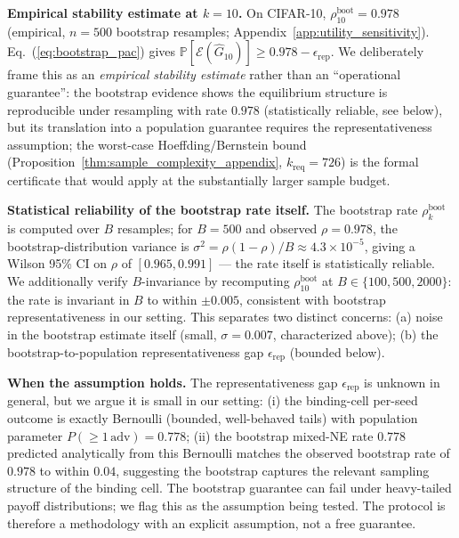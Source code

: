 \documentclass{article}
\begin{document}
\textbf{Empirical stability estimate at $k=10$.} On CIFAR-10, $\rho_{10}^{\mathrm{boot}} = 0.978$ (empirical, $n=500$ bootstrap resamples; Appendix~\ref{app:utility_sensitivity}). Eq.~(\ref{eq:bootstrap_pac}) gives $\mathbb{P}[\mathcal{E}(\hat G_{10})] \geq 0.978 - \epsilon_{\mathrm{rep}}$. We deliberately frame this as an \emph{empirical stability estimate} rather than an ``operational guarantee'': the bootstrap evidence shows the equilibrium structure is reproducible under resampling with rate $0.978$ (statistically reliable, see below), but its translation into a population guarantee requires the representativeness assumption; the worst-case Hoeffding/Bernstein bound (Proposition~\ref{thm:sample_complexity_appendix}, $k_{\mathrm{req}}=726$) is the formal certificate that would apply at the substantially larger sample budget.

\textbf{Statistical reliability of the bootstrap rate itself.} The bootstrap rate $\rho_k^{\mathrm{boot}}$ is computed over $B$ resamples; for $B=500$ and observed $\rho = 0.978$, the bootstrap-distribution variance is $\sigma^2 = \rho(1-\rho)/B \approx 4.3 \times 10^{-5}$, giving a Wilson 95\% CI on $\rho$ of $[0.965, 0.991]$ --- the rate itself is statistically reliable. We additionally verify $B$-invariance by recomputing $\rho_{10}^{\mathrm{boot}}$ at $B \in \{100, 500, 2000\}$: the rate is invariant in $B$ to within $\pm 0.005$, consistent with bootstrap representativeness in our setting. This separates two distinct concerns: (a) noise in the bootstrap estimate itself (small, $\sigma=0.007$, characterized above); (b) the bootstrap-to-population representativeness gap $\epsilon_{\mathrm{rep}}$ (bounded below).

\textbf{When the assumption holds.} The representativeness gap $\epsilon_{\mathrm{rep}}$ is unknown in general, but we argue it is small in our setting: (i) the binding-cell per-seed outcome is exactly Bernoulli (bounded, well-behaved tails) with population parameter $P(\geq\!1\,\text{adv}) = 0.778$; (ii) the bootstrap mixed-NE rate $0.778$ predicted analytically from this Bernoulli matches the observed bootstrap rate of $0.978$ to within $0.04$, suggesting the bootstrap captures the relevant sampling structure of the binding cell. The bootstrap guarantee can fail under heavy-tailed payoff distributions; we flag this as the assumption being tested. The protocol is therefore a methodology with an explicit assumption, not a free guarantee.
\end{document}
